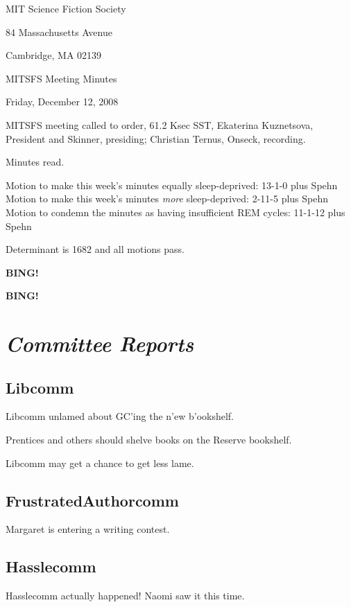 \documentclass[10pt]{article}
\newcommand{\bing}{{\bf BING!} }
\newcommand{\goto}[1]{\bing \vskip 12pt \section*{{\em{#1}}}}
\newcommand{\ps}{ plus Spehn\xspace}
\begin{document}
\begin{center}

MIT Science Fiction Society

84 Massachusetts Avenue

Cambridge, MA 02139

\vspace{12pt}

MITSFS Meeting Minutes

Friday, December 12, 2008

\end{center}

\vspace{18pt}

\setlength{\parskip}{6pt}

\noindent
MITSFS meeting called to order, 61.2 Ksec SST,
Ekaterina Kuznetsova, President and Skinner, presiding; Christian Ternus, Onseck, recording.

Minutes read.

Motion to make this week's minutes equally sleep-deprived: 13-1-0\ps
Motion to make this week's minutes \emph{more} sleep-deprived: 2-11-5\ps
Motion to condemn the minutes as having insufficient REM cycles: 11-1-12\ps

Determinant is 1682 and all motions pass.

\bing

\goto{Committee Reports}

\subsection*{Libcomm}

Libcomm unlamed about GC'ing the n'ew b'ookshelf.

Prentices and others should shelve books on the Reserve bookshelf.

Libcomm may get a chance to get less lame.

\subsection*{FrustratedAuthorcomm}

Margaret is entering a writing contest.

\subsection*{Hasslecomm}

Hasslecomm actually happened!  Naomi saw it this time.  
\end{document}
